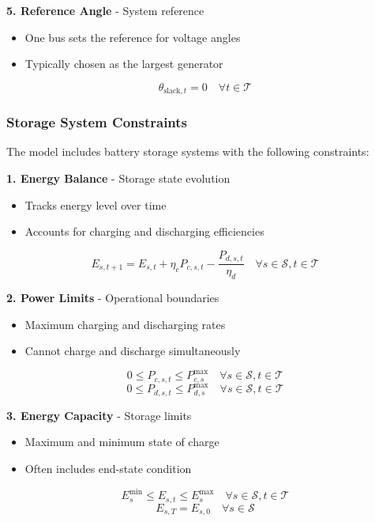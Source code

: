 \vspace{0.5cm}
\textbf{5. Reference Angle} - System reference
\begin{itemize}
    \item One bus sets the reference for voltage angles
    \item Typically chosen as the largest generator
\end{itemize}
\begin{equation}
    \theta_{\text{slack},t} = 0 \quad \forall t \in \mathcal{T}
\end{equation}

\subsubsection{Storage System Constraints}
The model includes battery storage systems with the following constraints:

\vspace{0.5cm}
\textbf{1. Energy Balance} - Storage state evolution
\begin{itemize}
    \item Tracks energy level over time
    \item Accounts for charging and discharging efficiencies
\end{itemize}
\begin{equation}
    E_{s,t+1} = E_{s,t} + \eta_c P_{c,s,t} - \frac{P_{d,s,t}}{\eta_d} \quad \forall s \in \mathcal{S}, t \in \mathcal{T}
\end{equation}

\vspace{0.5cm}
\textbf{2. Power Limits} - Operational boundaries
\begin{itemize}
    \item Maximum charging and discharging rates
    \item Cannot charge and discharge simultaneously
\end{itemize}
\begin{equation}
    0 \leq P_{c,s,t} \leq P_{c,s}^{\max} \quad \forall s \in \mathcal{S}, t \in \mathcal{T}
\end{equation}
\begin{equation}
    0 \leq P_{d,s,t} \leq P_{d,s}^{\max} \quad \forall s \in \mathcal{S}, t \in \mathcal{T}
\end{equation}

\vspace{0.5cm}
\textbf{3. Energy Capacity} - Storage limits
\begin{itemize}
    \item Maximum and minimum state of charge
    \item Often includes end-state condition
\end{itemize}
\begin{equation}
    E_{s}^{\min} \leq E_{s,t} \leq E_{s}^{\max} \quad \forall s \in \mathcal{S}, t \in \mathcal{T}
\end{equation}
\begin{equation}
    E_{s,T} = E_{s,0} \quad \forall s \in \mathcal{S}
\end{equation}

